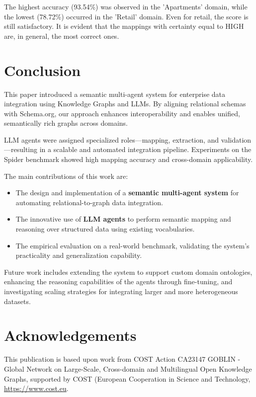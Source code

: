\documentclass[runningheads]{llncs}
\begin{document}
The highest accuracy (93.54\%) was observed in the 'Apartments' domain, while the lowest (78.72\%) occurred in the 'Retail' domain. Even for retail, the score is still satisfactory. It is evident that the mappings with certainty equal to HIGH are, in general, the most correct ones.

\section{Conclusion}

This paper introduced a semantic multi-agent system for enterprise data integration using Knowledge Graphs and LLMs. By aligning relational schemas with Schema.org, our approach enhances interoperability and enables unified, semantically rich graphs across domains.

LLM agents were assigned specialized roles—mapping, extraction, and validation—resulting in a scalable and automated integration pipeline. Experiments on the Spider benchmark showed high mapping accuracy and cross-domain applicability.

The main contributions of this work are:
\begin{itemize}
    \item The design and implementation of a \textbf{semantic multi-agent system} for automating relational-to-graph data integration.
    \item The innovative use of \textbf{LLM agents} to perform semantic mapping and reasoning over structured data using existing vocabularies.
    \item The empirical evaluation on a real-world benchmark, validating the system’s practicality and generalization capability.
\end{itemize}

Future work includes extending the system to support custom domain ontologies, enhancing the reasoning capabilities of the agents through fine-tuning, and investigating scaling strategies for integrating larger and more heterogeneous datasets.

\section{Acknowledgements}
This publication is based upon work from COST Action CA23147 GOBLIN - Global Network on Large-Scale, Cross-domain and Multilingual Open Knowledge Graphs, supported by COST (European Cooperation in Science and Technology, \href{https://www.cost.eu}{https://www.cost.eu}.



\end{document}
